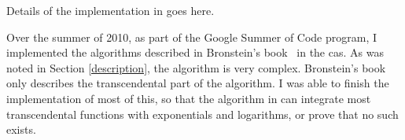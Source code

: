 Details of the implementation in \sympy goes here.

Over the summer of 2010, as part of the Goo\-gle Summer of Code program, I
implemented the algorithms described in Bronstein's
book~\cite{bronstein2005symbolic} in the \sympy \gls{cas}.  As was noted
in Section \ref{description}, the algorithm is very complex. 
Bronstein's book only describes the
transcendental%
part of the algorithm. I was able to finish the implementation of most
of this, so that the algorithm in \sympy can integrate most
transcendental functions with exponentials and logarithms, %
or prove that no such \antiderivative exists.  
